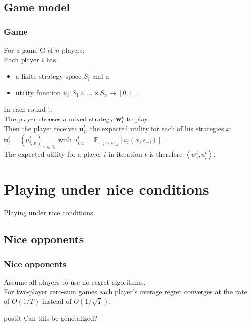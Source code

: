 \documentclass{beamer}
\renewcommand{\vec}[1]{\ensuremath{{\bf #1}}}
\begin{document}
\subsection{Game model}
\begin{frame}
	\frametitle{Game}
	For a game G of $n$ players:\\
	Each player $i$ has 
	\begin{itemize}
		\item a finite strategy space $S_i$ and a
		\item utility function $u_i : S_1 \times \ldots \times S_n \rightarrow [0,1]$.
	\end{itemize}\pause
	\vspace{1em}
	In each round t:\\
	The player chooses a  mixed strategy $\vec{w}^t_i$ to play. \\ \pause
	Then the player receives $\mathbf{u}^t_i$, the expected utility for each of his strategies $x$: $\mathbf{u}^t_i = (u^t_{i,x})_{x \in S_i} $ with $ u^t_{i,x} = \mathbb{E}_{s_{-i} \sim w^t_{-i}} \left[u_i(x,s_{-i})\right] $ \pause \\
	The expected utility for a player $i$ in iteration $t$ is therefore  $ \left\langle w^t_{i},u^t_{i}\right\rangle $.
	
\end{frame}





\section{Playing under nice conditions}
\begin{frame}[c]
	\begin{center}
		\Huge Playing under nice conditions
	\end{center}
\end{frame}
\subsection{Nice opponents}
\begin{frame}
	\frametitle{Nice opponents}
%
	Assume all players to use no-regret algorithms.\\ \pause
	\vspace{1em} 
	For two-player zero-sum games each player's average regret converges at the rate of $O(1/T)$ instead of $O(1/\sqrt{T})$.\\ \pause
	\vspace{1em}
	\begin{beamercolorbox}[sep=1em]{postit}
		Can this be generalized?
	\end{beamercolorbox}
	
\end{frame}
\end{document}
